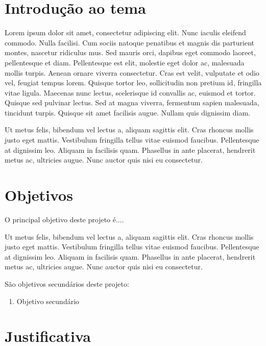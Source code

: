 \section{Introdução ao tema}
\label{sec:introducao}

Lorem ipsum dolor sit amet, consectetur adipiscing elit. Nunc iaculis
eleifend commodo. Nulla facilisi. Cum sociis natoque penatibus et
magnis dis parturient montes, nascetur ridiculus mus. Sed mauris orci,
dapibus eget commodo laoreet, pellentesque et diam. Pellentesque est
elit, molestie eget dolor ac, malesuada mollis turpis. Aenean ornare
viverra consectetur. Cras est velit, vulputate et odio vel, feugiat
tempus lorem. Quisque tortor leo, sollicitudin non pretium id,
fringilla vitae ligula. Maecenas nunc lectus, scelerisque id convallis
ac, euismod et tortor. Quisque sed pulvinar lectus. Sed at magna
viverra, fermentum sapien malesuada, tincidunt turpis. Quisque sit
amet facilisis augue. Nullam quis dignissim diam.


Ut metus felis, bibendum vel lectus a, aliquam sagittis elit. Cras
rhoncus mollis justo eget mattis. Vestibulum fringilla tellus vitae
euismod faucibus. Pellentesque at dignissim leo. Aliquam in facilisis
quam. Phasellus in ante placerat, hendrerit metus ac, ultricies augue.
Nunc auctor quis nisi eu consectetur.

\section{Objetivos}
\label{sec:objetivos}

O principal objetivo deste projeto é....

Ut metus felis, bibendum vel lectus a, aliquam sagittis elit. Cras
rhoncus mollis justo eget mattis. Vestibulum fringilla tellus vitae
euismod faucibus. Pellentesque at dignissim leo. Aliquam in facilisis
quam. Phasellus in ante placerat, hendrerit metus ac, ultricies augue.
Nunc auctor quis nisi eu consectetur.

São objetivos secundários deste projeto:

\begin{enumerate}
\item Objetivo secundário
\end{enumerate}

\section{Justificativa}
\label{sec:justificativa}

